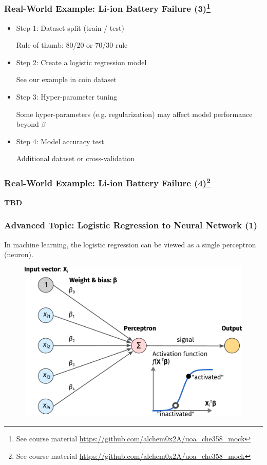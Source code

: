 \documentclass[10pt,aspectratio=169]{beamer}
\begin{document}
      \begin{frame}
        \frametitle{Real-World Example: Li-ion Battery Failure
          (3)\let\thefootnote\relax\footnote{{\tiny See course
              material
              \url{https://github.com/alchem0x2A/uoa_che358_mock}}}}

        \begin{itemize}
        \item Step 1: Dataset split (train / test)

          Rule of thumb: 80/20 or 70/30 rule
          
        \item Step 2: Create a logistic regression model

          See our example in coin dataset
          
        \item Step 3: Hyper-parameter tuning

          Some hyper-parameters (e.g. regularization) may affect model
          performance beyond $\beta$
          
        \item Step 4: Model accuracy test

          Additional dataset or cross-validation
        \end{itemize}
        
        
      \end{frame}

      \begin{frame}
        \frametitle{Real-World Example: Li-ion Battery Failure
          (4)\let\thefootnote\relax\footnote{{\tiny See course
              material
              \url{https://github.com/alchem0x2A/uoa_che358_mock}}}}

        \textbf{TBD}
        
        
      \end{frame}

      \begin{frame}
        \frametitle{Advanced Topic: Logistic Regression to Neural
          Network (1)}
        In machine learning, the logistic regression can be viewed as
        a single perceptron (neuron).

        \begin{figure}[t]
          \includegraphics[width=0.65\linewidth]{images/nn-1.pdf}
        \end{figure}

        
      \end{frame}
\end{document}
